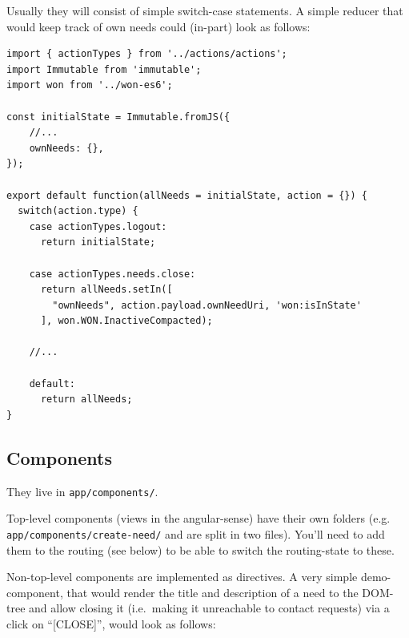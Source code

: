 \documentclass[a4paper,,tablecaptionabove]{scrbook}
\newcommand{\passthrough}[1]{#1}
\begin{document}
Usually they will consist of simple switch-case statements. A simple
reducer that would keep track of own needs could (in-part) look as
follows:

\begin{lstlisting}[caption={Simple example reducer.}, label=fig:reducer]
import { actionTypes } from '../actions/actions';
import Immutable from 'immutable';
import won from '../won-es6';

const initialState = Immutable.fromJS({
    //...
    ownNeeds: {},
});

export default function(allNeeds = initialState, action = {}) {
  switch(action.type) {
    case actionTypes.logout:
      return initialState;

    case actionTypes.needs.close:
      return allNeeds.setIn([
        "ownNeeds", action.payload.ownNeedUri, 'won:isInState'
      ], won.WON.InactiveCompacted);

    //...

    default:
      return allNeeds;
}
\end{lstlisting}

\hypertarget{sec:components}{%
\subsection{Components}\label{sec:components}}

They live in \passthrough{\lstinline!app/components/!}.

Top-level components (views in the angular-sense) have their own folders
(e.g. \passthrough{\lstinline!app/components/create-need/!} and are
split in two files). You'll need to add them to the routing (see below)
to be able to switch the routing-state to these.

Non-top-level components are implemented as directives. A very simple
demo-component, that would render the title and description of a need to
the DOM-tree and allow closing it (i.e.~making it unreachable to contact
requests) via a click on \enquote{{[}CLOSE{]}}, would look as follows:
\end{document}
